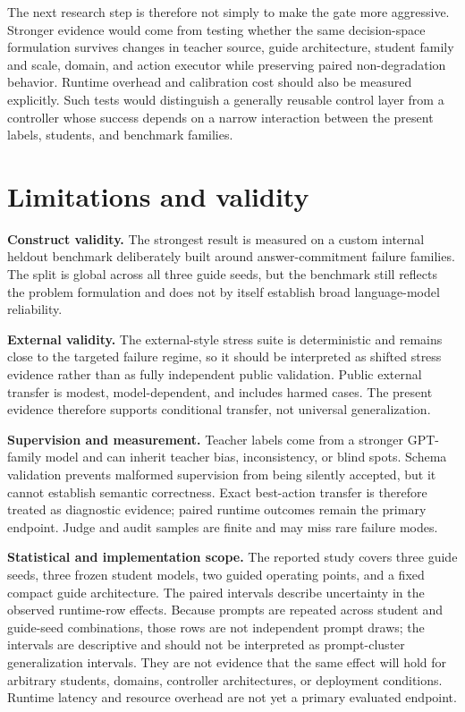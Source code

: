 \documentclass[11pt]{article}
\begin{document}
The next research step is therefore not simply to make the gate more aggressive. Stronger evidence would come from testing whether the same decision-space formulation survives changes in teacher source, guide architecture, student family and scale, domain, and action executor while preserving paired non-degradation behavior. Runtime overhead and calibration cost should also be measured explicitly. Such tests would distinguish a generally reusable control layer from a controller whose success depends on a narrow interaction between the present labels, students, and benchmark families.

\section{Limitations and validity}
\textbf{Construct validity.} The strongest result is measured on a custom internal heldout benchmark deliberately built around answer-commitment failure families. The split is global across all three guide seeds, but the benchmark still reflects the problem formulation and does not by itself establish broad language-model reliability.

\textbf{External validity.} The external-style stress suite is deterministic and remains close to the targeted failure regime, so it should be interpreted as shifted stress evidence rather than as fully independent public validation. Public external transfer is modest, model-dependent, and includes harmed cases. The present evidence therefore supports conditional transfer, not universal generalization.

\textbf{Supervision and measurement.} Teacher labels come from a stronger GPT-family model and can inherit teacher bias, inconsistency, or blind spots. Schema validation prevents malformed supervision from being silently accepted, but it cannot establish semantic correctness. Exact best-action transfer is therefore treated as diagnostic evidence; paired runtime outcomes remain the primary endpoint. Judge and audit samples are finite and may miss rare failure modes.

\textbf{Statistical and implementation scope.} The reported study covers three guide seeds, three frozen student models, two guided operating points, and a fixed compact guide architecture. The paired intervals describe uncertainty in the observed runtime-row effects. Because prompts are repeated across student and guide-seed combinations, those rows are not independent prompt draws; the intervals are descriptive and should not be interpreted as prompt-cluster generalization intervals. They are not evidence that the same effect will hold for arbitrary students, domains, controller architectures, or deployment conditions. Runtime latency and resource overhead are not yet a primary evaluated endpoint.
\end{document}

